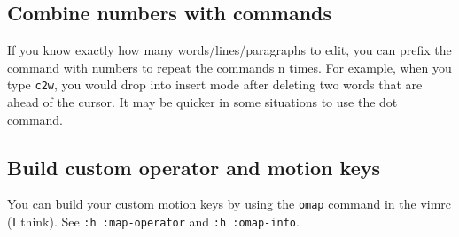 \subsection{Combine numbers with commands}

If you know exactly how many words/lines/paragraphs to edit, you can prefix the command with numbers to repeat the commands n times.
For example, when you type \verb|c2w|, you would drop into insert mode after deleting two words that are ahead of the cursor.
It may be quicker in some situations to use the dot command.

\subsection{Build custom operator and motion keys}

You can build your custom motion keys by using the \verb|omap| command in the vimrc (I think).
See \verb|:h :map-operator| and \verb|:h :omap-info|.

